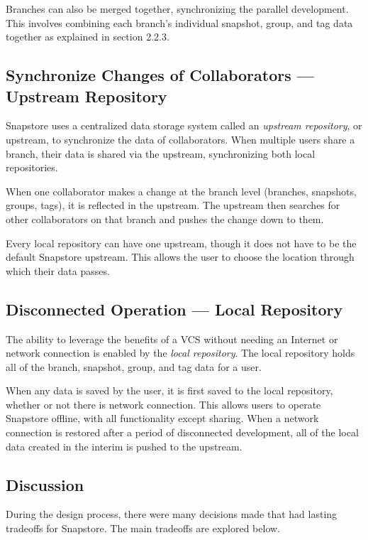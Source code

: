 Branches can also be merged together, synchronizing the parallel development. This involves combining each branch's individual snapshot, group, and tag data together as explained in section 2.2.3.

\subsection{Synchronize Changes of Collaborators --- Upstream Repository}

Snapstore uses a centralized data storage system called an \textit{upstream repository}, or upstream, to synchronize the data of collaborators. When multiple users share a branch, their data is shared via the upstream, synchronizing both local repositories.

When one collaborator makes a change at the branch level (branches, snapshots, groups, tags), it is reflected in the upstream. The upstream then searches for other collaborators on that branch and pushes the change down to them.

Every local repository can have one upstream, though it does not have to be the default Snapstore upstream. This allows the user to choose the location through which their data passes.

\subsection{Disconnected Operation --- Local Repository}

The ability to leverage the benefits of a VCS without needing an Internet or network connection is enabled by the \textit{local repository}. The local repository holds all of the branch, snapshot, group, and tag data for a user.

When any data is saved by the user, it is first saved to the local repository, whether or not there is network connection. This allows users to operate Snapstore offline, with all functionality except sharing. When a network connection is restored after a period of disconnected development, all of the local data created in the interim is pushed to the upstream.

\subsection{Discussion}

During the design process, there were many decisions made that had lasting tradeoffs for Snapstore. The main tradeoffs are explored below.

